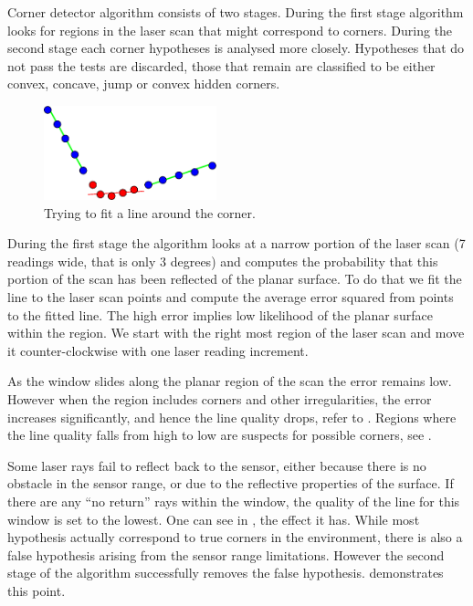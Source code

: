 Corner detector algorithm consists of two stages. During the
first stage algorithm looks for regions in the laser scan that might
correspond to corners. During the second stage each corner hypotheses
is analysed more closely. Hypotheses that do not pass the tests are
discarded, those that remain are classified to be either convex,
concave, jump or convex hidden corners.

\begin{figure}[htbp]
  \centering
  \includegraphics[width=5cm]{Pics/fig_corner_example}
  \caption{Trying to fit a line around the corner.}
  \label{fig:corner_example}
\end{figure}

During the first stage the algorithm looks at a narrow portion of the
laser scan (7 readings wide, that is only 3 degrees) and computes the
probability that this portion of the scan has been reflected of the
planar surface. To do that we fit the line to the laser scan points
and compute the average error squared from points to the fitted line.
The high error implies low likelihood of the planar surface within the
region. We start with the right most region of the laser scan and move
it counter-clockwise with one laser reading increment.

As the window slides along the planar region of the scan the error
remains low. However when the region includes corners and other
irregularities, the error increases significantly, and hence the line
quality drops, refer to . Regions where
the line quality falls from high to low are suspects for possible
corners, see .

Some laser rays fail to reflect back to the sensor, either because
there is no obstacle in the sensor range, or due to the reflective
properties of the surface. If there are any ``no return'' rays within
the window, the quality of the line for this window is set to the
lowest. One can see in , the
effect it has. While most hypothesis actually correspond to true
corners in the environment, there is also a false hypothesis arising
from the sensor range limitations. However the second stage of the
algorithm successfully removes the false hypothesis.
 demonstrates this point.

